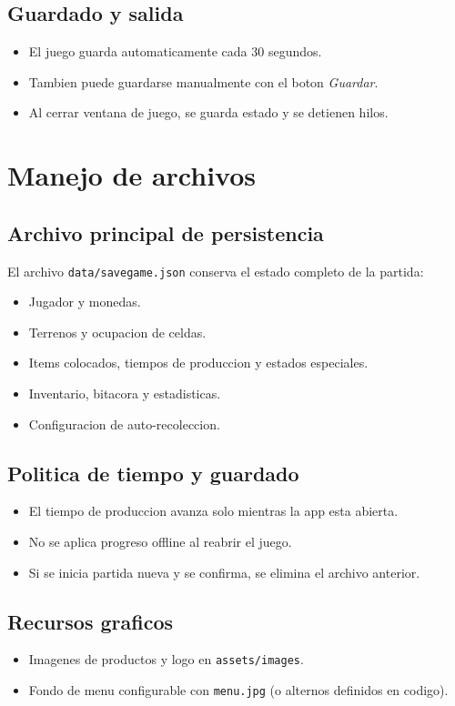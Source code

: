 \documentclass[12pt,a4paper]{article}
\begin{document}
\subsection{Guardado y salida}
\begin{itemize}
    \item El juego guarda automaticamente cada 30 segundos.
    \item Tambien puede guardarse manualmente con el boton \textit{Guardar}.
    \item Al cerrar ventana de juego, se guarda estado y se detienen hilos.
\end{itemize}

\section{Manejo de archivos}
\subsection{Archivo principal de persistencia}
El archivo \texttt{data/savegame.json} conserva el estado completo de la partida:
\begin{itemize}
    \item Jugador y monedas.
    \item Terrenos y ocupacion de celdas.
    \item Items colocados, tiempos de produccion y estados especiales.
    \item Inventario, bitacora y estadisticas.
    \item Configuracion de auto-recoleccion.
\end{itemize}

\subsection{Politica de tiempo y guardado}
\begin{itemize}
    \item El tiempo de produccion avanza solo mientras la app esta abierta.
    \item No se aplica progreso offline al reabrir el juego.
    \item Si se inicia partida nueva y se confirma, se elimina el archivo anterior.
\end{itemize}

\subsection{Recursos graficos}
\begin{itemize}
    \item Imagenes de productos y logo en \texttt{assets/images}.
    \item Fondo de menu configurable con \texttt{menu.jpg} (o alternos definidos en codigo).
\end{itemize}
\end{document}
